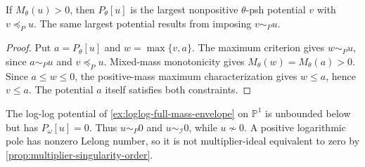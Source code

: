 \begin{corollary}\label{cor:p-envelope-ordered-competitors}
If $M_\theta(u)>0$, then $P_\theta[u]$ is the largest nonpositive $\theta$-psh potential $v$ with $v\preceq_P u$. The same largest potential results from imposing $v\sim_P u$.
\end{corollary}
\begin{proof}
Put $a=P_\theta[u]$ and $w=\max\{v,a\}$. The maximum criterion gives $w\sim_P u$, since $a\sim_P u$ and $v\preceq_P u$. Mixed-mass monotonicity gives $M_\theta(w)=M_\theta(a)>0$. Since $a\leq w\leq0$, the positive-mass maximum characterization gives $w\leq a$, hence $v\leq a$. The potential $a$ itself satisfies both constraints.
\end{proof}

\begin{example}\label{ex:ordinary-and-model-types-differ}
The log-log potential of \cref{ex:loglog-full-mass-envelope} on $\mathbb P^1$ is unbounded below but has $P_\omega[u]=0$. Thus $u\sim_P0$ and $u\sim_{\mathcal I}0$, while $u\not\sim0$. A positive logarithmic pole has nonzero Lelong number, so it is not multiplier-ideal equivalent to zero by \cref{prop:multiplier-singularity-order}.
\end{example}

